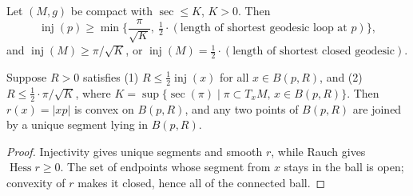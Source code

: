 \begin{lemma}
  \label{lem:pet-ch6-klingenberg-injectivity-estimate}
  Let $(M,g)$ be compact with $\sec\le K$, $K>0$. Then
  \[
    \operatorname{inj}(p)\ge\min\Big\{\frac{\pi}{\sqrt K},\ \tfrac12\cdot
    (\text{length of shortest geodesic loop at }p)\Big\},
  \]
  and $\operatorname{inj}(M)\ge\pi/\sqrt K$, or
  $\operatorname{inj}(M)=\tfrac12\cdot(\text{length of shortest closed geodesic})$.
\end{lemma}

\begin{theorem}
  \label{thm:pet-ch6-convexity-radius-criterion}
  Suppose $R>0$ satisfies (1) $R\le\tfrac12\operatorname{inj}(x)$ for all $x\in B(p,R)$,
  and (2) $R\le\tfrac12\cdot\pi/\sqrt K$, where
  $K=\sup\{\sec(\pi)\mid\pi\subset T_xM,\,x\in B(p,R)\}$. Then $r(x)=|xp|$ is
  convex on $B(p,R)$, and any two points of $B(p,R)$ are joined by a unique
  segment lying in $B(p,R)$.
\end{theorem}
\begin{proof}
  \sketch
  Injectivity gives unique segments and smooth \(r\), while Rauch gives \(\operatorname{Hess}r\ge0\). The set of endpoints whose segment from \(x\) stays in the ball is open; convexity of \(r\) makes it closed, hence all of the connected ball.
\end{proof}

